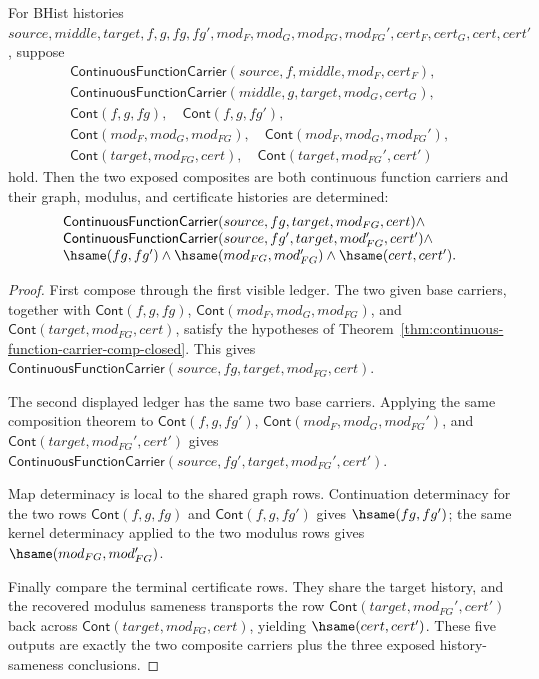 \begin{theorem}
\label{thm:continuous-function-carrier-parallel-composite-determinacy}
For BHist histories $source,middle,target,f,g,fg,fg',mod_F,mod_G,mod_{FG},
mod_{FG}',cert_F,cert_G,cert,cert'$, suppose
$$
\begin{array}{l}
\mathsf{ContinuousFunctionCarrier}(source,f,middle,mod_F,cert_F),\\
\mathsf{ContinuousFunctionCarrier}(middle,g,target,mod_G,cert_G),\\
\mathsf{Cont}(f,g,fg),\quad \mathsf{Cont}(f,g,fg'),\\
\mathsf{Cont}(mod_F,mod_G,mod_{FG}),\quad
\mathsf{Cont}(mod_F,mod_G,mod_{FG}'),\\
\mathsf{Cont}(target,mod_{FG},cert),\quad
\mathsf{Cont}(target,mod_{FG}',cert')
\end{array}
$$
hold. Then the two exposed composites are both continuous function carriers
and their graph, modulus, and certificate histories are determined:
$$
\begin{array}{l}
\mathsf{ContinuousFunctionCarrier}(source,fg,target,mod_{FG},cert)\land\\
\mathsf{ContinuousFunctionCarrier}(source,fg',target,mod_{FG}',cert')\land\\
\hsame(fg,fg')\land\hsame(mod_{FG},mod_{FG}')\land\hsame(cert,cert').
\end{array}
$$
\end{theorem}
\begin{proof}
First compose through the first visible ledger. The two given base carriers,
together with $\mathsf{Cont}(f,g,fg)$, $\mathsf{Cont}(mod_F,mod_G,mod_{FG})$,
and $\mathsf{Cont}(target,mod_{FG},cert)$, satisfy the hypotheses of
Theorem~\ref{thm:continuous-function-carrier-comp-closed}. This gives
$\mathsf{ContinuousFunctionCarrier}(source,fg,target,mod_{FG},cert)$.

The second displayed ledger has the same two base carriers. Applying the same
composition theorem to $\mathsf{Cont}(f,g,fg')$,
$\mathsf{Cont}(mod_F,mod_G,mod_{FG}')$, and
$\mathsf{Cont}(target,mod_{FG}',cert')$ gives
$\mathsf{ContinuousFunctionCarrier}(source,fg',target,mod_{FG}',cert')$.

Map determinacy is local to the shared graph rows. Continuation determinacy
for the two rows $\mathsf{Cont}(f,g,fg)$ and $\mathsf{Cont}(f,g,fg')$ gives
$\hsame(fg,fg')$; the same kernel determinacy applied to the two modulus rows
gives $\hsame(mod_{FG},mod_{FG}')$.

Finally compare the terminal certificate rows. They share the target history,
and the recovered modulus sameness transports the row
$\mathsf{Cont}(target,mod_{FG}',cert')$ back across
$\mathsf{Cont}(target,mod_{FG},cert)$, yielding $\hsame(cert,cert')$. These
five outputs are exactly the two composite carriers plus the three exposed
history-sameness conclusions.
\end{proof}

